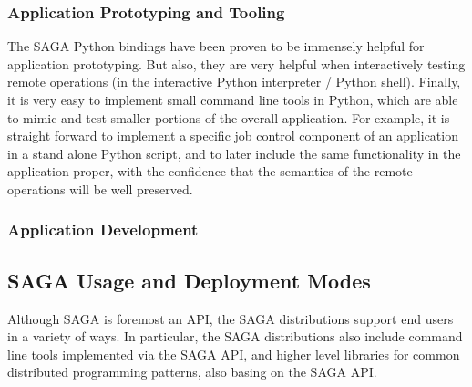 \documentclass[10pt,conference,final,letterpaper,twoside,twocolumn,]{IEEEtran}
\begin{document}
\subsubsection*{Application Prototyping and Tooling}

The SAGA Python bindings have been proven to be immensely helpful for
application prototyping.  But also, they are very helpful when
interactively testing remote operations (in the interactive Python
interpreter / Python shell).  Finally, it is very easy to implement
small command line tools in Python, which are able to mimic and test
smaller portions of the overall application.  For example, it is
straight forward to implement a specific job control component of an
application in a stand alone Python script, and to later include the
same functionality in the application proper, with the confidence that
the semantics of the remote operations will be well
preserved. %

\subsubsection*{Application Development}






\subsection{SAGA Usage and Deployment Modes}

Although SAGA is foremost an API, the SAGA distributions support end
users in a variety of ways.  In particular, the SAGA distributions
also include command line tools implemented via the SAGA API, and
higher level libraries for common distributed programming patterns,
also basing on the SAGA API.
\end{document}
